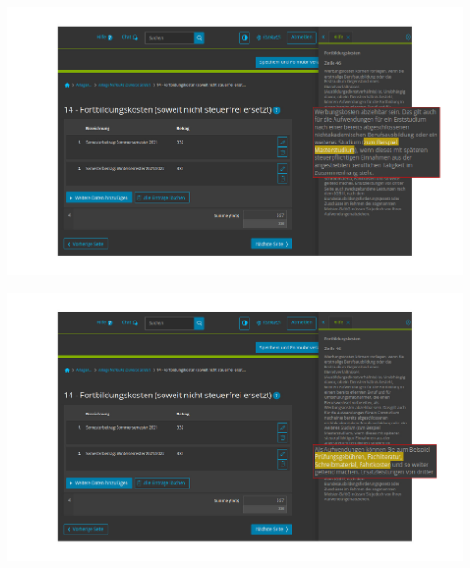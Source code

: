 \documentclass{beamer}
\begin{document}
			\begin{frame}
				\begin{center}
					\vspace{-0.6cm}
					\hspace*{-0.91cm}
					\includegraphics[scale=0.24]{images/elster-fortbildungskosten-2}
				\end{center}
			\end{frame}
			
			\begin{frame}
				\begin{center}
					\vspace{-0.6cm}
					\hspace*{-0.91cm}
					\includegraphics[scale=0.24]{images/elster-fortbildungskosten-3}
				\end{center}
			\end{frame}
		
\end{document}
